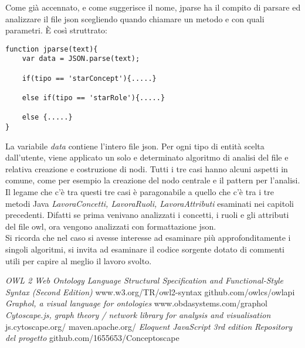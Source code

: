 \documentclass[Lau,binding=0.6cm]{sapthesis}
\begin{document}
Come già accennato, e come suggerisce il nome, jparse ha il compito di parsare ed analizzare il file json scegliendo quando chiamare un metodo e con quali parametri.
È così struttrato:
\begin{verbatim}
function jparse(text){
    var data = JSON.parse(text);
    
    if(tipo == 'starConcept'){.....}
    
    else if(tipo == 'starRole'){.....}
    
    else {.....}
}

\end{verbatim}
La variabile \textit{data} contiene l'intero file json. Per ogni tipo di entità scelta dall'utente, viene applicato un solo e determinato algoritmo di analisi del file e relativa creazione e costruzione di nodi. Tutti i tre casi hanno alcuni aspetti in comune, come per esempio la creazione del nodo centrale e il pattern per l'analisi. Il legame che c'è tra questi tre casi è paragonabile a quello che c'è tra i tre metodi Java \textit{LavoraConcetti, LavoraRuoli, LavoraAttributi} esaminati nei capitoli precedenti. Difatti se prima venivano analizzati i concetti, i ruoli e gli attributi del file owl, ora vengono analizzati con formattazione json.
\\Si ricorda che nel caso si avesse interesse ad esaminare più approfonditamente i singoli algoritmi, si invita ad esaminare il codice sorgente dotato di commenti utili per capire al meglio il lavoro svolto.

\begin{thebibliography}{Tesi}
		\emph{OWL 2 Web Ontology Language 
Structural Specification and Functional-Style Syntax (Second Edition)}  www.w3.org/TR/owl2-syntax 
		 github.com/owlcs/owlapi
		 \emph{Graphol, a visual language for ontologies}  www.obdasystems.com/graphol
		 \emph{Cytoscape.js, graph theory / network library for analysis and visualisation} js.cytoscape.org/
		 maven.apache.org/
		 \emph{Eloquent JavaScript 3rd edition}
		\bibitem{} \emph{Repository del progetto} github.com/1655653/Conceptoscape
\end{thebibliography}




\backmatter
\end{document}
